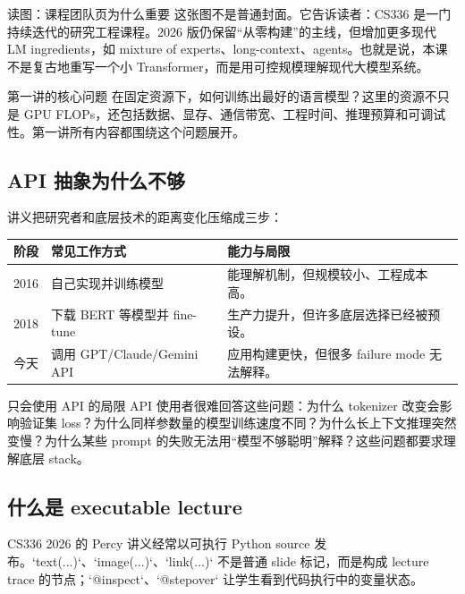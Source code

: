 \documentclass[a4paper]{article}
\begin{document}
\begin{knowledgebox}{读图：课程团队页为什么重要}
这张图不是普通封面。它告诉读者：CS336 是一门持续迭代的研究工程课程。2026 版仍保留“从零构建”的主线，但增加更多现代 LM ingredients，如 mixture of experts、long-context、agents。也就是说，本课不是复古地重写一个小 Transformer，而是用可控规模理解现代大模型系统。
\end{knowledgebox}

\begin{importantbox}{第一讲的核心问题}
在固定资源下，如何训练出最好的语言模型？这里的资源不只是 GPU FLOPs，还包括数据、显存、通信带宽、工程时间、推理预算和可调试性。第一讲所有内容都围绕这个问题展开。
\end{importantbox}

\subsection{API 抽象为什么不够}

讲义把研究者和底层技术的距离变化压缩成三步：

\begin{longtable}{p{}p{}p{}}
\toprule
\textbf{阶段} & \textbf{常见工作方式} & \textbf{能力与局限} \\
\midrule
2016 & 自己实现并训练模型 & 能理解机制，但规模较小、工程成本高。 \\
2018 & 下载 BERT 等模型并 fine-tune & 生产力提升，但许多底层选择已经被预设。 \\
今天 & 调用 GPT/Claude/Gemini API & 应用构建更快，但很多 failure mode 无法解释。 \\
\bottomrule
\end{longtable}

\begin{warningbox}{只会使用 API 的局限}
API 使用者很难回答这些问题：为什么 tokenizer 改变会影响验证集 loss？为什么同样参数量的模型训练速度不同？为什么长上下文推理突然变慢？为什么某些 prompt 的失败无法用“模型不够聪明”解释？这些问题都要求理解底层 stack。
\end{warningbox}

\subsection{什么是 executable lecture}

CS336 2026 的 Percy 讲义经常以可执行 Python source 发布。`text(...)`、`image(...)`、`link(...)` 不是普通 slide 标记，而是构成 lecture trace 的节点；`@inspect`、`@stepover` 让学生看到代码执行中的变量状态。
\end{document}
